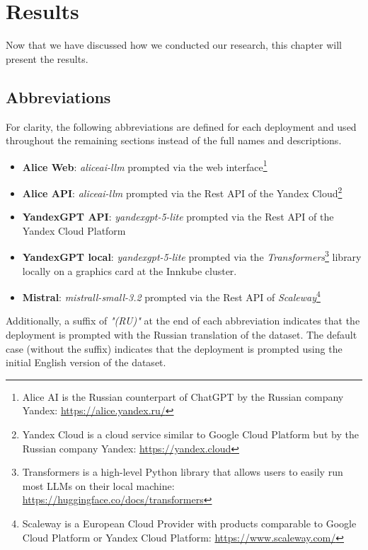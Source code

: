 \chapter{Results}\label{chap:results}

Now that we have discussed how we conducted our research, this chapter will present the results.

\section{Abbreviations}

For clarity, the following abbreviations are defined for each deployment and used throughout the remaining sections instead of the full names and descriptions.

\begin{itemize}
	\item \textbf{Alice Web}: \textit{aliceai-llm} prompted via the web interface\footnote{Alice AI is the Russian counterpart of ChatGPT by the Russian company Yandex: \url{https://alice.yandex.ru/}}
	\item \textbf{Alice API}: \textit{aliceai-llm} prompted via the Rest API of the Yandex Cloud\footnote{Yandex Cloud is a cloud service similar to Google Cloud Platform but by the Russian company Yandex: \url{https://yandex.cloud}}
	\item \textbf{YandexGPT API}: \textit{yandexgpt-5-lite} prompted via the Rest API of the Yandex Cloud Platform
	\item \textbf{YandexGPT local}: \textit{yandexgpt-5-lite} prompted via the \textit{Transformers}\footnote{Transformers is a high-level Python library that allows users to easily run most LLMs on their local machine: \url{https://huggingface.co/docs/transformers}} library locally on a graphics card at the Innkube cluster.
	\item \textbf{Mistral}: \textit{mistrall-small-3.2} prompted via the Rest API of \textit{Scaleway}\footnote{Scaleway is a European Cloud Provider with products comparable to Google Cloud Platform or Yandex Cloud Platform: \url{https://www.scaleway.com/}}
\end{itemize}

Additionally, a suffix of \textit{"(RU)"} at the end of each abbreviation indicates that the deployment is prompted with the Russian translation of the dataset. The default case (without the suffix) indicates that the deployment is prompted using the initial English version of the dataset.

